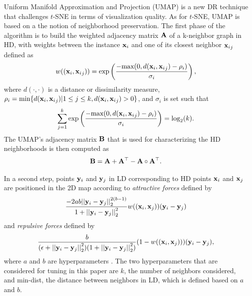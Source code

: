 Uniform Manifold Approximation and Projection (UMAP) \cite{mcinnes2018umap} is a new DR technique that challenges $t$-SNE in terms of visualization quality. As for $t$-SNE, UMAP is based on a the notion of neighborhood preservation. The first phase of the algorithm is to build the weighted adjacency matrix ${\bf A}$ of a k-neighbor graph in HD, with weights between the instance ${\bf x}_i$ and one of its closest neighbor ${{\bf x}_i}_j$ defined as
\begin{equation*}
    w(({\bf x}_i, {{\bf x}_i}_j)) = \textnormal{exp} \left( \frac{-\textnormal{max}(0, d({\bf x}_i, {{\bf x}_i}_j) - \rho_i)}{\sigma_i} \right),
\end{equation*}
where $d(\cdot, \cdot)$ is a distance or dissimilarity measure, $\rho_i = \textnormal{min}\{d({\bf x}_i, {{\bf x}_i}_j) | 1 \leq j \leq k, d({\bf x}_i, {{\bf x}_i}_j) > 0\}$, and $\sigma_i$ is set such that
\begin{equation*}
    \sum _{j=1}^k \textnormal{exp} \left( \frac{-\textnormal{max}(0, d({\bf x}_i, {{\bf x}_i}_j) - \rho_i)}{\sigma_i} \right) = \textnormal{log}_2(k).
\end{equation*}
The UMAP's adjacency matrix ${\bf B}$ that is used for characterizing the HD neighborhoods is then computed as
\begin{equation*}
    {\bf B} = {\bf A} + {\bf A}^\top - {\bf A} \circ {\bf A}^\top.
\end{equation*}

In a second step, points ${\bf y}_i$ and ${\bf y}_j$ in LD corresponding to HD points ${\bf x}_i$ and ${\bf x}_j$ are positioned in the 2D map according to \textit{attractive forces} defined by
\begin{equation*}
    \frac{-2ab{||{\bf y}_i - {\bf y}_j||}^{2(b-1)}_2}{1+{||{\bf y}_i - {\bf y}_j||}^2_2}w(({\bf x}_i, {\bf x}_j))({\bf y}_i - {\bf y}_j)
\end{equation*}
and \textit{repulsive forces} defined by
\begin{equation*}
    \frac{b}{(\epsilon+{||{\bf y}_i - {\bf y}_j||}^2_2)(1+{||{\bf y}_i - {\bf y}_j||}^2_2)}(1-w(({\bf x}_i, {\bf x}_j)))({\bf y}_i - {\bf y}_j),
\end{equation*}
where $a$ and $b$ are hyperparameters \cite{mcinnes2018umap}. The two hyperparameters that are considered for tuning in this paper are $k$, the number of neighbors considered, and min-dist, the distance between neighbors in LD, which is defined based on $a$ and $b$. 

